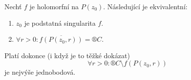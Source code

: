 \documentclass[12pt]{article}					%
\begin{document}
\begin{veta}
	Nechť $f$ je holomorfní na $P(z_0)$. Následující je ekvivalentní:

	\begin{enumerate}
		\item $z_0$ je podstatná singularita $f$.
		\item $\forall r > 0: \overline{f(P(z_0, r))} = ®C$.
	\end{enumerate}

	\begin{poznamka}
		Platí dokonce (i když je to těžké dokázat)
		$$ \forall r > 0: ®C \setminus f(P(z_0, r)) $$
		je nejvýše jednobodová.
	\end{poznamka}
\end{veta}
\end{document}
